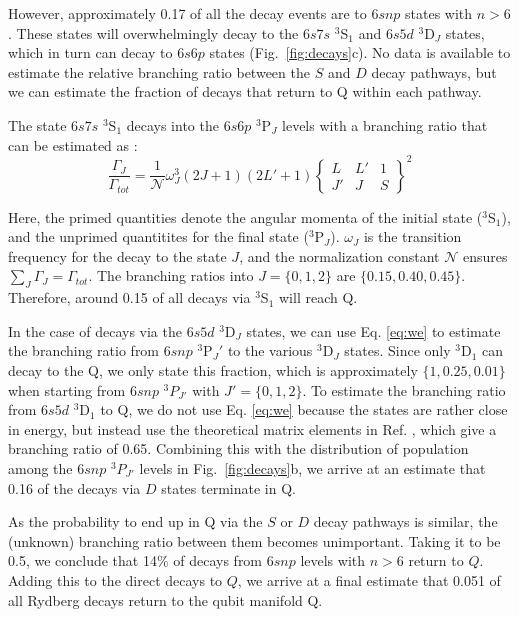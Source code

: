 \documentclass[%
reprint,
superscriptaddress,
 amsmath,amssymb,
 aps,
 prx,
floatfix,
]{revtex4-1}
\newcommand{\sixj}[6]{ \begin{Bmatrix}
  #1 & #2 & #3 \\
  #4 & #5 & #6 
 \end{Bmatrix}}
\begin{document}
However, approximately 0.17 of all the decay events are to $6snp$ states with $n>6$. These states will overwhelmingly decay to the $6s7s$ $^3$S$_1$ and $6s5d$ $^3$D$_J$ states, which in turn can decay to $6s6p$ states (Fig.~\ref{fig:decays}c). No data is available to estimate the relative branching ratio between the $S$ and $D$ decay pathways, but we can estimate the fraction of decays that return to Q within each pathway.

The state $6s7s$ $^3$S$_1$ decays into the $6s6p$ $^3$P$_J$ levels with a branching ratio that can be estimated as \cite{martin2013}:
\begin{equation}
\label{eq:we}
    \frac{\Gamma_J}{\Gamma_{tot}} = \frac{1}{\mathcal{N}}\omega^3_J (2J+1)(2L'+1) \sixj{L}{L'}{1}{J'}{J}{S}^2
\end{equation}

Here, the primed quantities denote the angular momenta of the initial state ($^3$S$_1$), and the unprimed quantitites for the final state ($^3$P$_J$). $\omega_J$ is the transition frequency for the decay to the state $J$, and the normalization constant $\mathcal{N}$ ensures $\sum_J \Gamma_J = \Gamma_{tot}$. The branching ratios into $J = \{0,1,2\}$ are $\{0.15,0.40,0.45\}$. Therefore, around 0.15 of all decays via $^3$S$_1$ will reach Q.

In the case of decays via the $6s5d$ $^3$D$_J$ states, we can use Eq. \eqref{eq:we} to estimate the branching ratio from $6snp$ $^3$P$_J'$ to the various $^3$D$_J$ states. Since only $^3$D$_1$ can decay to the Q, we only state this fraction, which is approximately $\{1,0.25,0.01\}$ when starting from $6snp$ $^3P_{J'}$ with $J'=\{0,1,2\}$. To estimate the branching ratio from $6s5d$ $^3$D$_1$ to Q, we do not use Eq. \eqref{eq:we} because the states are rather close in energy, but instead use the theoretical matrix elements in Ref. \cite{porsev1999}, which give a branching ratio of 0.65. Combining this with the distribution of population among the $6snp$ $^3P_{J'}$ levels in Fig.~\ref{fig:decays}b, we arrive at an estimate that 0.16 of the decays via $D$ states terminate in Q.

As the probability to end up in Q via the $S$ or $D$ decay pathways is similar, the (unknown) branching ratio between them becomes unimportant. Taking it to be 0.5, we conclude that 14\% of decays from $6snp$ levels with $n>6$ return to $Q$. Adding this to the direct decays to $Q$, we arrive at a final estimate that 0.051 of all Rydberg decays return to the qubit manifold Q.
\end{document}
